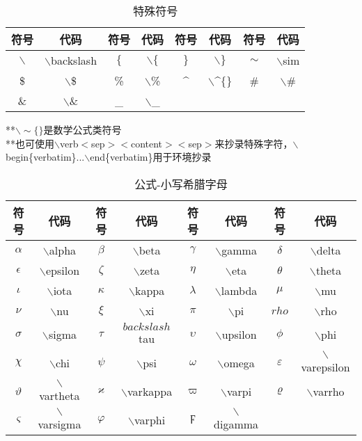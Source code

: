 \documentclass[UTF8,fontset=ubuntu]{ctexart}
\begin{document}
\begin{table}
\begin{tabular}{c c c c c c c c}
	\hline
	符号 & 代码 & 符号 & 代码 & 符号 & 代码 & 符号 & 代码\\
	\hline
	$\backslash$ & $\backslash$backslash & $\{$ & $\backslash\{$ & $\}$ & $\backslash\}$ & $\sim$ & $\backslash$sim\\
	\$ & $\backslash$\$ & \% & $\backslash$\% & \^{} & $\backslash$\^{}$\{\}$ & \# & $\backslash$\#\\
	\& & $\backslash$\& & \_ & $\backslash$\_\\
	\hline
\end{tabular}\par
**$\backslash \sim \{ \}$是数学公式类符号\\
**也可使用$\backslash$verb$<$sep$><$content$><$sep$>$来抄录特殊字符，$\backslash$begin\{verbatim\}...$\backslash$end\{verbatim\}用于环境抄录\\
\caption{特殊符号}
\end{table}
\begin{table}
\begin{tabular}{c c c c c c c c}
	\hline
	符号 & 代码 & 符号 & 代码 & 符号 & 代码 & 符号 & 代码\\
	\hline
	$\alpha$ & $\backslash$alpha & $\beta$ & $\backslash$beta & $\gamma$ & $\backslash$gamma & $\delta$ & $\backslash$delta\\
	$\epsilon$ & $\backslash$epsilon & $\zeta$ & $\backslash$zeta & $\eta$ & $\backslash$eta & $\theta$ & $\backslash$theta\\
	$\iota$ & $\backslash$iota & $\kappa$ & $\backslash$kappa & $\lambda$ & $\backslash$lambda & $\mu$ & $\backslash$mu\\
	$\nu$ & $\backslash$nu & $\xi$ & $\backslash$xi & $\pi$ & $\backslash$pi & $rho$ & $\backslash$rho\\
	$\sigma$ & $\backslash$sigma & $\tau$ & $backslash$tau & $\upsilon$ & $\backslash$upsilon & $\phi$ & $\backslash$phi\\
	$\chi$ & $\backslash$chi & $\psi$ & $\backslash$psi & $\omega$ & $\backslash$omega & $\varepsilon$ & $\backslash$varepsilon\\
	$\vartheta$ & $\backslash$vartheta & $\varkappa$ & $\backslash$varkappa\footnotemark[1] & $\varpi$ & $\backslash$varpi & $\varrho$ & $\backslash$varrho\footnotemark[1]\\
	$\varsigma$ & $\backslash$varsigma & $\varphi$ & $\backslash$varphi & $\digamma$ & $\backslash$digamma\footnotemark[1]\\
	\hline
\end{tabular}
\caption{公式-小写希腊字母}
\end{table}
\end{document}
